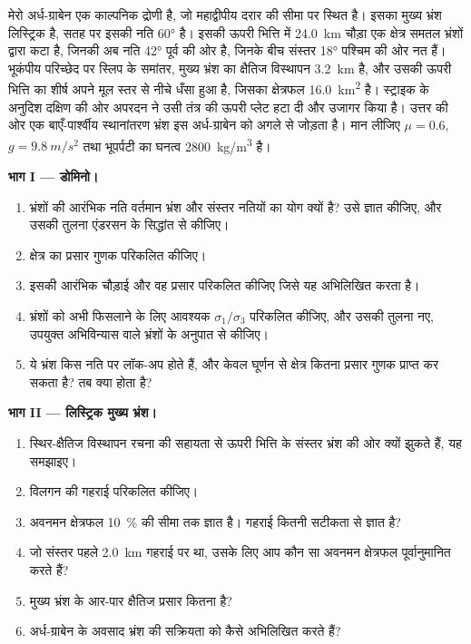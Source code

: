 \begin{problem}
\label{pb:b3:extension-strike-slip:1}
मेरो अर्ध-ग्राबेन एक काल्पनिक द्रोणी है, जो महाद्वीपीय
दरार की सीमा पर स्थित है। इसका मुख्य भ्रंश लिस्ट्रिक है, सतह पर इसकी नति \ang{60} है। इसकी
ऊपरी भित्ति में \qty{24.0}{km} चौड़ा एक क्षेत्र समतल भ्रंशों द्वारा कटा है, जिनकी अब नति
\ang{42} पूर्व की ओर है, जिनके बीच संस्तर \ang{18} पश्चिम की ओर नत हैं। भूकंपीय परिच्छेद पर
स्लिप के समांतर, मुख्य भ्रंश का क्षैतिज विस्थापन \qty{3.2}{km} है, और उसकी ऊपरी भित्ति का शीर्ष
अपने मूल स्तर से नीचे धँसा हुआ है, जिसका क्षेत्रफल
\qty{16.0}{km^2} है। स्ट्राइक के अनुदिश दक्षिण की ओर अपरदन ने उसी तंत्र की ऊपरी
प्लेट हटा दी और  उजागर किया है। उत्तर की ओर एक
बाएँ-पार्श्वीय स्थानांतरण भ्रंश इस अर्ध-ग्राबेन को अगले से जोड़ता है। मान लीजिए $\mu =
0.6$, $g = \qty{9.8}{m/s^2}$ तथा भूपर्पटी का घनत्व
\qty{2800}{kg/m^3} है।

\medskip\noindent\textbf{भाग I --- डोमिनो।}
\begin{enumerate}
  \item भ्रंशों की आरंभिक नति वर्तमान भ्रंश
        और संस्तर नतियों का योग क्यों है? उसे ज्ञात कीजिए, और उसकी तुलना एंडरसन के सिद्धांत से कीजिए।
  \item क्षेत्र का प्रसार गुणक परिकलित कीजिए।
  \item इसकी आरंभिक चौड़ाई और वह प्रसार परिकलित कीजिए जिसे यह अभिलिखित करता है।
  \item भ्रंशों को अभी फिसलाने के लिए आवश्यक  $\sigma_1/\sigma_3$ परिकलित कीजिए,
        और उसकी तुलना नए, उपयुक्त अभिविन्यास वाले भ्रंशों के अनुपात से कीजिए।
  \item ये भ्रंश किस नति पर लॉक-अप होते हैं, और केवल घूर्णन से क्षेत्र कितना प्रसार गुणक
        प्राप्त कर सकता है? तब क्या होता है?
\end{enumerate}

\medskip\noindent\textbf{भाग II --- लिस्ट्रिक मुख्य भ्रंश।}
\begin{enumerate}[resume]
  \item स्थिर-क्षैतिज विस्थापन रचना की सहायता से ऊपरी भित्ति के
        संस्तर भ्रंश की ओर क्यों झुकते हैं, यह समझाइए।
  \item विलगन की गहराई परिकलित कीजिए।
  \item अवनमन क्षेत्रफल \qty{10}{\percent} की सीमा तक ज्ञात है। गहराई कितनी सटीकता से
        ज्ञात है?
  \item जो संस्तर पहले \qty{2.0}{km} गहराई पर था, उसके लिए आप कौन सा अवनमन क्षेत्रफल
        पूर्वानुमानित करते हैं?
  \item मुख्य भ्रंश के आर-पार क्षैतिज प्रसार कितना है?
  \item अर्ध-ग्राबेन के अवसाद भ्रंश की सक्रियता को
        कैसे अभिलिखित करते हैं?
\end{enumerate}


\end{problem}
